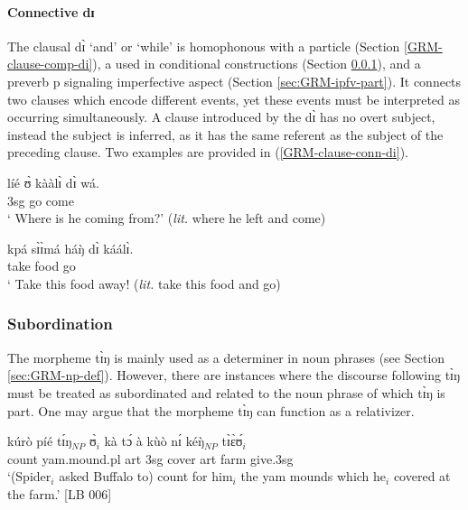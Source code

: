 \paragraph{Connective dɪ}
\label{GRM-clause-coord-di}
The clausal  {\sls dɪ̀} `and' or `while'  is homophonous with a
 particle (Section \ref{GRM-clause-comp-di}), a  used in
conditional constructions (Section \ref{GRM-clause-subord}),   and a preverb
p signaling imperfective aspect (Section \ref{sec:GRM-ipfv-part}). It
connects two clauses which encode different events, yet these events must be
interpreted as occurring simultaneously.  A clause introduced by the 
{\sls dɪ̀} has no overt subject, instead the subject is inferred, as it has the
same referent as the subject of the preceding clause. Two examples are
provided in (\ref{GRM-clause-conn-di}). 


\ea\label{GRM-clause-conn-di}

\ea\label{GRM-clause-conn-di-vp22.4.9.}
\gll líé ʊ̀ kààlɪ̀ dɪ̀ wá.\\
  {\q} {\sc 3sg} go {\conn} come\\
\glt  ` Where is he coming from?' ({\it lit.} where he left and  come)

\ex\label{GRM-clause-conn-di-vp47.2.9.}
\gll kpá sɪ̀ɪ̀má háŋ̀ dɪ̀ káálɪ̀.\\
 take   food {\dem}  {\conn} go\\
\glt  ` Take this food away! ({\it lit.} take this food and go)


\z 
 \z



\subsubsection{Subordination}
\label{GRM-clause-subord}

The morpheme {\sls tɪ̀ŋ} is mainly used as a  determiner in noun phrases  (see Section 
\ref{sec:GRM-np-def}).  However, there are instances where the discourse following {\sls tɪ̀ŋ} must 
be treated as subordinated and related to the noun phrase of which  {\sls tɪ̀ŋ} is part. One may 
argue that the morpheme {\sls tɪ̀ŋ} can function as a relativizer. 

\ea\label{GRM-clause-subord-rel} 
\gll  kúrò {\ob}{\ob}píé tɪ́ŋ{\cb}$_{NP}$  ʊ̀$_{i}$ kà tɔ́ à kùò nɪ́ kéŋ̀{\cb}$_{NP}$  tɪ̀ɛ̀ʊ́$_{i}$\\
 count yam.mound.{\sc pl}  {\sc art} {\sc 3sg} {\egr} cover {\sc art} farm {\postp} 
{\dxm} give.{\sc 3sg}\\
\glt  `(Spider$_{i}$ asked Buffalo to) count  for him$_{i}$ the yam mounds which
he$_{i}$ covered at the farm.' [LB 006]
 \z


